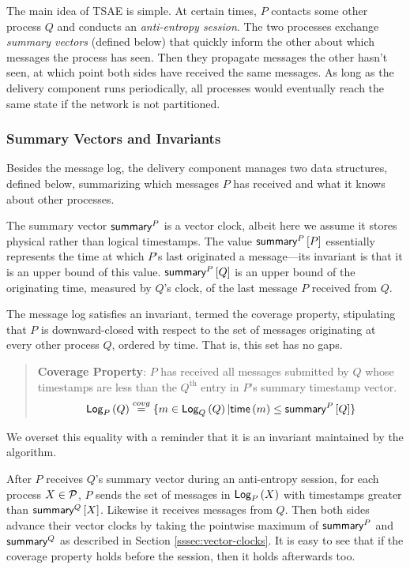 \documentclass[]             %
{NASA}                       %
\theoremstyle{definition}
\begin{document}
The main idea of TSAE is simple. At certain times, $P$ contacts some
other process $Q$ and conducts an \emph{anti-entropy session}. The two
processes exchange \emph{summary vectors} (defined below) that quickly
inform the other about which messages the process has seen. Then they
propagate messages the other hasn't seen, at which point both sides
have received the same messages. As long as the delivery component
runs periodically, all processes would eventually reach the same state
if the network is not partitioned.

\subsubsection{Summary Vectors and Invariants}
\label{sssec:tsae-summary-vectors}
Besides the message log, the delivery component manages two data
structures, defined below, summarizing which messages $P$ has received
and what it knows about other processes.

The summary vector $\textsf{summary}^{P}$ is a vector clock, albeit here we
assume it stores physical rather than logical timestamps. The value
$\textsf{summary}^{P}\left[P\right]$ essentially represents the time at which $P$'s last
originated a message---its invariant is that it is an upper bound of
this value. $\textsf{summary}^{P}\left[Q\right]$ is an upper bound of the originating
time, measured by $Q$'s clock, of the last message $P$ received from
$Q$.

The message log satisfies an invariant, termed the coverage property,
stipulating that $P$ is downward-closed with respect to the set of
messages originating at every other process $Q$, ordered by time. That
is, this set has no gaps.
\begin{quote}
  \textbf{Coverage Property}: $P$ has received all messages submitted
  by $Q$ whose timestamps are less than the $Q^\textrm{th}$ entry in
  $P$'s summary timestamp vector.
  \[ \textsf{Log}_{P}\left(Q\right) \overset{covg}{=} \{m \in \textsf{Log}_{Q}\left(Q\right) | \mathsf{time}\left(m\right) \leq \textsf{summary}^{P}\left[Q\right] \} \]
\end{quote}
We overset this equality with a reminder that it is an invariant
maintained by the algorithm.

After $P$ receives $Q$'s summary vector during an anti-entropy
session, for each process $X \in \mathcal{P}$, $P$ sends the set of
messages in $\textsf{Log}_{P}\left(X\right)$ with timestamps greater than
$\textsf{summary}^{Q}\left[X\right]$. Likewise it receives messages from $Q$. Then both
sides advance their vector clocks by taking the pointwise maximum of
$\textsf{summary}^{P}$ and $\textsf{summary}^{Q}$ as described in Section
\ref{sssec:vector-clocks}. It is easy to see that if the coverage
property holds before the session, then it holds afterwards too.
\end{document}
